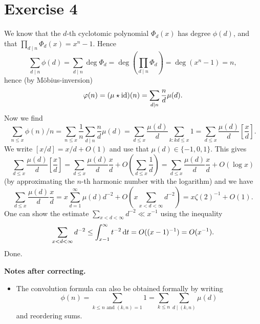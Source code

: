 \documentclass[a4paper,11pt]{article}
\begin{document}
\section*{Exercise 4}
We know that the $d$-th cyclotomic polynomial $\Phi_d(x)$ has degree $\phi(d)$, and that 
$\prod_{d \mid n} \Phi_d(x) = x^n - 1$. Hence 
\[
\sum_{d \mid n} \phi(d) = \sum_{d \mid n} \deg \Phi_d = \deg \left(\prod_{d
\mid n} \Phi_d \right) = \deg(x^n - 1) = n,
\]
hence (by Möbius-inversion)
\[
    \varphi(n) = (\mu \star \operatorname{id})(n) = \sum_{d\mid n}\frac nd \mu(d). 
\]
Now we find 
\[
    \sum_{n \leq x} \phi(n) / n = \sum_{n \leq x} \frac 1n \sum_{d \mid n}
    \frac nd \mu(d) = \sum_{d \leq x} \frac{\mu(d)}d \sum_{k : kd \leq x} 1 = 
    \sum_{d \leq x} \frac{\mu(d)}d \left[\frac xd \right].
\]
We write $[x/d] = x/d + O(1)$ and use that $\mu(d) \in \{-1, 0, 1\}$. This gives 
\[
    \sum_{d \leq x} \frac{\mu(d)}d \left[\frac xd \right] 
    = \sum_{d \leq x} \frac{\mu(d)}d \frac xd + O\left(\sum_{d \leq x} \frac 1d \right) 
    = \sum_{d \leq x} \frac{\mu(d)}d \frac xd + O(\log x)
\]
(by approximating the $n$-th harmonic number with the logarithm) and 
we have 
\[
    \sum_{d \leq x} \frac{\mu(d)}d \frac xd = x \sum_{d = 1}^\infty \mu(d) d^{-2} + 
    O \left(x \sum_{x < d < \infty} d^{-2} \right) = x \zeta(2)^{-1} + O(1).
\]
One can show the estimate $\sum_{x < d < \infty} d^{-2} \ll x^{-1}$ using the inequality
\[
    \sum_{x < d < \infty} d^{-2} \leq \int_{x-1}^\infty t^{-2} \mathrm{\,d} t = O((x-1)^{-1}) = O(x^{-1}).
\]
Done. 

\textbf{Notes after correcting.} \leavevmode
\begin{itemize}
    \item The convolution formula can also be obtained formally by writing
        \[
            \phi(n) = \sum_{k \leq n \text{ and } (k,n) = 1} 1 = \sum_{k \leq
            n} \sum_{d \mid (k,n)} \mu(d)
        \]
        and reordering sums.
\end{itemize}
\end{document}
